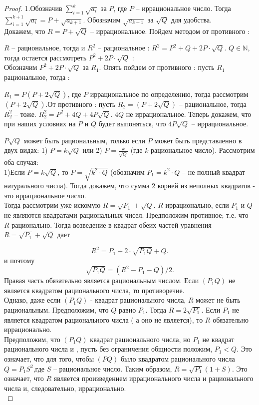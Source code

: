 \documentclass[a4paper,12pt]{article} %
\begin{document}
\begin{proof}
1.Обозначив $\sum\limits_{i=1}^{k} \sqrt{a_{i}}$ за $P$, где $P$ -- иррациональное число. Тогда $\sum\limits_{i=1}^{k+1} \sqrt{a_{i}} = P + \sqrt{a_{k+1}}$. Обозначим $\sqrt{a_{k+1}}$ за $\sqrt{Q}$ для удобства.\\
Докажем, что $ R = P + \sqrt{Q}$ -- иррациональное. Пойдем методом от противного :

$R$ -- рациональное, тогда и $R^2$ -- рациональное : $R^2 = P^2 + Q + 2P\cdot \sqrt{Q}.$ $Q \in \mathbb{N}$, тогда остается рассмотреть $P^2 + 2P\cdot \sqrt{Q}$ :\\
Обозначим $P^2 + 2P\cdot \sqrt{Q}$ за $R_1$. Опять пойдем от противного : пусть $R_1$ рациональное, тогда :

$R_1= P(P+2\sqrt{Q})$, где $P$ иррациональное по определению, тогда рассмотрим $(P+2\sqrt{Q})$.От противного : пусть $R_2 = (P+2\sqrt{Q})$ -- рациональное, тогда $R_2^2$ -- тоже.
$R_2^2 = P^2 + 4Q + 4P\sqrt{Q}$. $4Q$ не иррациональное. Теперь докажем, что при наших условиях на $P$ и $Q$ будет выпоняться, что $4P\sqrt{Q}$ -- иррациональное.

$P\sqrt{Q}$ может быть рациональным, только если $P$ может быть представленно в двух видах: 1) $P = k\sqrt{Q}$  или 2) $P = \frac{k}{\sqrt{Q}}$ (где $k$ рациональное число). Рассмотрим оба случая:\\

1)Если $P = k\sqrt{Q}$, то $P = \sqrt{k^2\cdot Q}$ (обозначим $P_1 = k^2\cdot Q$ -- не полный квадрат натурального числа). Тогда докажем, что сумма 2 корней из неполных квадратов - это иррациональное число.\\
Тогда рассмотрим уже искомую $R = \sqrt{P_1} + \sqrt{Q}$. $R$ иррационально, если ${P_1}$ и $ Q$ не являются квадратами рациональных чисел. Предположим противное; т.е. что $R$ рационально. Тогда возведение в квадрат обеих частей уравнения $R = \sqrt{P_1} + \sqrt{Q}$ дает

\[ R^2 = P_1 + 2\cdot \sqrt{{P_1}Q} + Q.\] и поэтому \[\sqrt{{P_1}Q} = (R^2 - {P_1} - Q) \slash 2.\]
Правая часть обязательно является рациональным числом. Если $({P_1}Q)$ не является квадратом рационального числа, то противоречие.\\
Однако, даже если $({P_1}Q)$ - квадрат рационального числа, $R$ может не быть рациональным. Предположим, что $Q$ равно ${P_1}$. Тогда $R = 2\sqrt{{P_1}}$. Если ${P_1}$ не является квадратом рационального числа ( а оно не является), то $R$ обязательно иррационально.\\
Предположим, что $({P_1}Q)$ квадрат рационального числа, но ${P_1}$ не квадрат рационального числа и , пусть без ограничения общности положим, ${P_1} < Q$. Это означает, что для того, чтобы $(PQ)$ было квадратом рационального числа $Q = {P_1}S^2$,где $S$ -- рациональное число. Таким образом, $ R = \sqrt{{P_1}} (1 + S)$. Это означает, что $R$ является произведением иррационального числа и рационального числа и, следовательно, иррационально.\\


\end{proof}
\end{document}
